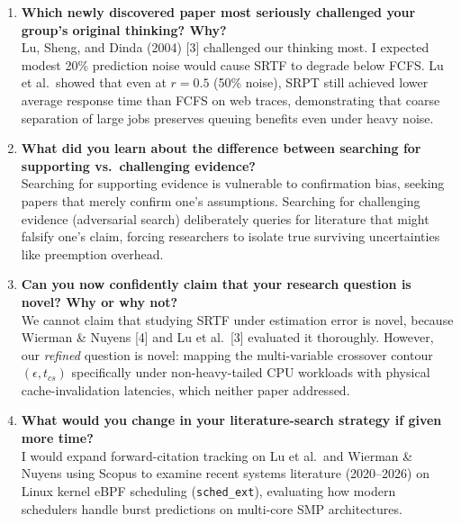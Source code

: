 \documentclass[11pt]{article}
\newcommand{\topicTitle}[1]{
    \vspace{0.5em}\noindent{\fontsize{11.5}{13.8}\selectfont \textbf{#1}}\par\vspace{0.25em}
}
\begin{document}
\topicTitle{J. Student 1: Gaurav Acharya (MT26MCS024)}
{\small
\begin{enumerate}[leftmargin=1.2em, itemsep=0.04em, parsep=0pt]
    \item \textbf{Which newly discovered paper most seriously challenged your group's original thinking? Why?} \\
    Lu, Sheng, and Dinda (2004) [3] challenged our thinking most. I expected modest 20\% prediction noise would cause SRTF to degrade below FCFS. Lu et al.\ showed that even at $r = 0.5$ (50\% noise), SRPT still achieved lower average response time than FCFS on web traces, demonstrating that coarse separation of large jobs preserves queuing benefits even under heavy noise.

    \item \textbf{What did you learn about the difference between searching for supporting vs.\ challenging evidence?} \\
    Searching for supporting evidence is vulnerable to confirmation bias, seeking papers that merely confirm one's assumptions. Searching for challenging evidence (adversarial search) deliberately queries for literature that might falsify one's claim, forcing researchers to isolate true surviving uncertainties like preemption overhead.

    \item \textbf{Can you now confidently claim that your research question is novel? Why or why not?} \\
    We cannot claim that studying SRTF under estimation error is novel, because Wierman \& Nuyens [4] and Lu et al.~[3] evaluated it thoroughly. However, our \textit{refined} question is novel: mapping the multi-variable crossover contour $(\epsilon, t_{cs})$ specifically under non-heavy-tailed CPU workloads with physical cache-invalidation latencies, which neither paper addressed.

    \item \textbf{What would you change in your literature-search strategy if given more time?} \\
    I would expand forward-citation tracking on Lu et al.\ and Wierman \& Nuyens using Scopus to examine recent systems literature (2020--2026) on Linux kernel eBPF scheduling (\texttt{sched\_ext}), evaluating how modern schedulers handle burst predictions on multi-core SMP architectures.
\end{enumerate}
}
\end{document}
